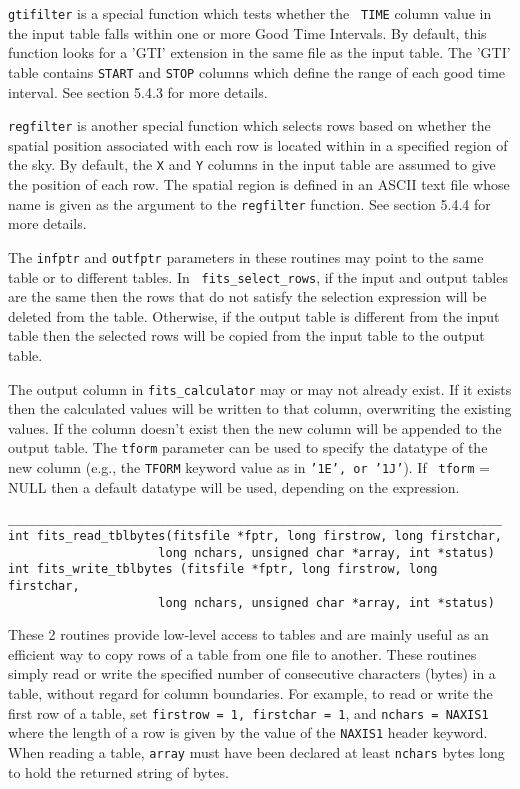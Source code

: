\documentclass[11pt]{article}
\begin{document}
{\tt gtifilter} is a special function which tests whether the {\tt
TIME} column value in the input table falls within one or more Good
Time Intervals.  By default, this function looks for a 'GTI' extension
in the same file as the input table.  The 'GTI' table contains {\tt START} 
and {\tt STOP} columns which define the range of
each good time interval. See section 5.4.3 for more details.

{\tt regfilter} is another special function which selects rows based on
whether the spatial position associated with each row is located within
in a specified region of the sky.  By default, the {\tt X} and {\tt Y}
columns in the input table are assumed to give the position of each row.
The spatial region is defined in an ASCII text file whose name is given
as the argument to the {\tt regfilter} function. See section 5.4.4 for
more details.

The {\tt infptr} and {\tt outfptr} parameters in these routines may
point to the same table or to different tables.  In {\tt
fits\_select\_rows}, if the input and output tables are the same then
the rows that do not satisfy the selection expression will be deleted
from the table.  Otherwise, if the output table is different from the
input table then the selected rows will be copied from the input table
to the output table.

The output column in {\tt fits\_calculator} may or may not already
exist.  If it exists then the calculated values will be written to that
column, overwriting the existing values.  If the column doesn't exist
then the new column will be appended to the output table. The {\tt tform}
parameter can be used to specify the datatype of the new column (e.g.,
the {\tt TFORM} keyword value as in {\tt '1E', or '1J'}). If {\tt
tform} = NULL then a default datatype will be used, depending on the
expression.

\begin{verbatim}
_____________________________________________________________________
int fits_read_tblbytes(fitsfile *fptr, long firstrow, long firstchar,
                     long nchars, unsigned char *array, int *status)
int fits_write_tblbytes (fitsfile *fptr, long firstrow, long firstchar,
                     long nchars, unsigned char *array, int *status)
\end{verbatim}

These 2 routines provide low-level access to tables and are mainly
useful as an efficient way to copy rows of a table from one file to
another.  These routines simply read or write the specified number of
consecutive characters (bytes) in a table, without regard for column
boundaries.  For example, to read or write the first row of a table,
set {\tt firstrow = 1, firstchar = 1}, and {\tt nchars = NAXIS1} where
the length of a row is given by the value of the {\tt NAXIS1} header
keyword.  When reading a table, {\tt array} must have been declared at
least {\tt nchars} bytes long to hold the returned string of bytes.
\end{document}
